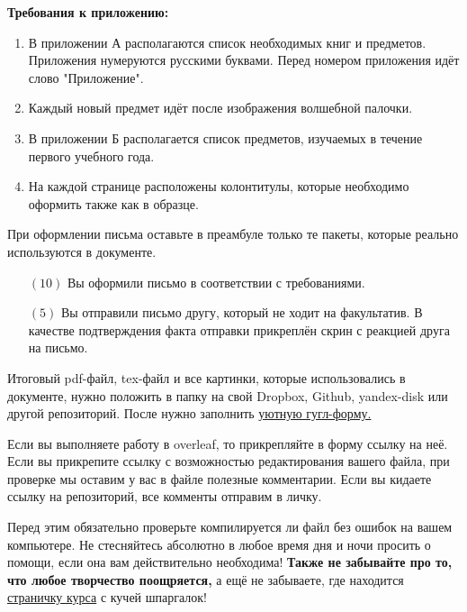 \documentclass[12pt, a4paper, oneside]{article}
\begin{document}
\textbf{Требования к приложению:}
\begin{enumerate}[resume]
\item  В приложении А располагаются список необходимых книг и предметов.  Приложения нумеруются русскими буквами. Перед номером приложения идёт слово "Приложение".
\item  Каждый новый предмет идёт после изображения волшебной палочки.
\item  В приложении Б располагается список предметов, изучаемых в течение первого учебного года.
\item  На каждой странице расположены колонтитулы, которые необходимо оформить также как в образце.
\end{enumerate}

При оформлении письма оставьте в преамбуле только те пакеты, которые реально используются в документе.

\begin{itemize}
\item[$(10)$] Вы оформили письмо в соответствии с требованиями.

\item[$(5)$] Вы отправили письмо другу, который не ходит на факультатив. В качестве подтверждения факта отправки прикреплён скрин с реакцией друга на письмо.
\end{itemize}

Итоговый pdf-файл, tex-файл и все картинки, которые использовались в документе, нужно положить в папку на свой Dropbox, Github, yandex-disk или другой репозиторий. После нужно заполнить \href{https://docs.google.com/forms/d/e/1FAIpQLSe11kxKVfv07iCL1E9yNX7ll9swKImiVwRr1H70lslGzInRSg/viewform}{уютную гугл-форму.}  

Если вы выполняете работу в overleaf, то прикрепляйте в форму ссылку на неё. Если вы прикрепите ссылку с возможностью редактирования вашего файла, при проверке мы оставим у вас в файле полезные комментарии. Если вы кидаете ссылку на репозиторий, все комменты отправим в личку.

Перед этим обязательно проверьте компилируется ли файл без ошибок на вашем компьютере. Не стесняйтесь абсолютно в любое время дня и ночи просить о помощи, если она вам действительно необходима! \textbf{Также не забывайте про то, что любое творчество поощряется,} а ещё не забываете, где  находится  \href{https://fulyankin.github.io/LaTeX/}{страничку курса} с кучей шпаргалок!
\end{document}
